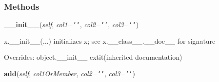   \subsubsection{Methods}

    \vspace{0.5ex}

\hspace{.8\funcindent}\begin{boxedminipage}{\funcwidth}

    \raggedright \textbf{\_\_init\_\_}(\textit{self}, \textit{col1}={\tt \texttt{'}\texttt{}\texttt{'}}, \textit{col2}={\tt \texttt{'}\texttt{}\texttt{'}}, \textit{col3}={\tt \texttt{'}\texttt{}\texttt{'}})

\setlength{\parskip}{2ex}
    x.\_\_init\_\_(...) initializes x; see x.\_\_class\_\_.\_\_doc\_\_ for 
    signature

\setlength{\parskip}{1ex}
      Overrides: object.\_\_init\_\_ 	extit{(inherited documentation)}

    \end{boxedminipage}

    \label{tracetool:TMemberNode:add}

    \vspace{0.5ex}

\hspace{.8\funcindent}\begin{boxedminipage}{\funcwidth}

    \raggedright \textbf{add}(\textit{self}, \textit{col1OrMember}, \textit{col2}={\tt \texttt{'}\texttt{}\texttt{'}}, \textit{col3}={\tt \texttt{'}\texttt{}\texttt{'}})

\setlength{\parskip}{2ex}
\setlength{\parskip}{1ex}
    \end{boxedminipage}

    \label{tracetool:TMemberNode:setFontDetail}

    \vspace{0.5ex}

